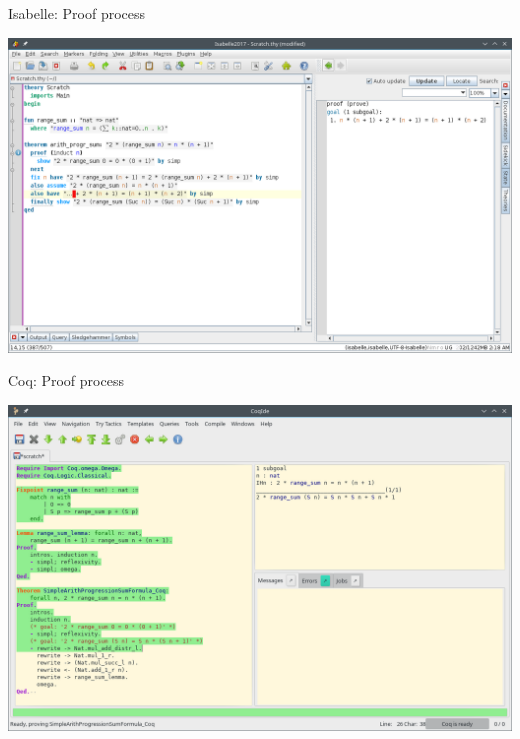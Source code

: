 \documentclass[aspectratio=169, 12pt, fleqn]{beamer}
\begin{document}
\begin{frame}[fragile]{Isabelle: Proof process} %
\begin{center}
  \includegraphics[scale=0.38]{img/isabelle_arith.png}
\end{center}
\end{frame}


\begin{frame}[fragile]{Coq: Proof process}
\begin{center}
  \includegraphics[scale=0.38]{img/coq_arith.png}
\end{center}
\end{frame}
\end{document}
